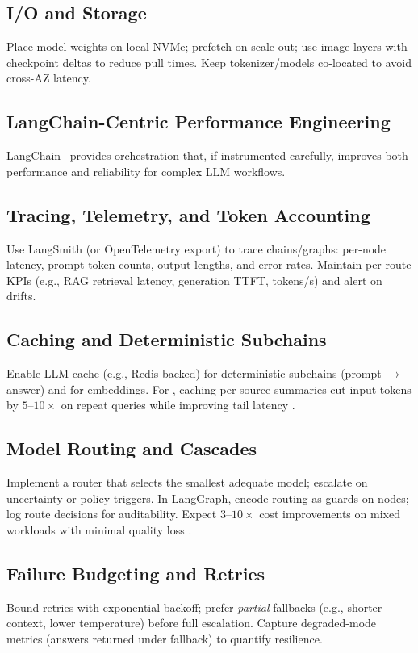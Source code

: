 \subsection{I/O and Storage}
Place model weights on local NVMe; prefetch on scale-out; use image layers with checkpoint deltas to reduce pull times. Keep tokenizer/models co-located to avoid cross-AZ latency.

\subsection{LangChain-Centric Performance Engineering}
\label{sec:perf-langchain}
LangChain~\cite{LangChain2023Framework} provides orchestration that, if instrumented carefully, improves both performance and reliability for complex LLM workflows.

\subsection{Tracing, Telemetry, and Token Accounting}
Use LangSmith (or OpenTelemetry export) to trace chains/graphs: per-node latency, prompt token counts, output lengths, and error rates. Maintain per-route KPIs (e.g., RAG retrieval latency, generation TTFT, tokens/s) and alert on drifts.

\subsection{Caching and Deterministic Subchains}
Enable LLM cache (e.g., Redis-backed) for deterministic subchains (prompt $\rightarrow$ answer) and for embeddings. For \ishtar{}, caching per-source summaries cut input tokens by $5$--$10\times$ on repeat queries while improving tail latency \cite{langchain-cache}.

\subsection{Model Routing and Cascades}
\label{sec:perf-model-routing}
Implement a router that selects the smallest adequate model; escalate on uncertainty or policy triggers. In LangGraph, encode routing as guards on nodes; log route decisions for auditability. Expect $3$--$10\times$ cost improvements on mixed workloads with minimal quality loss \cite{frugalgpt_2023}.

\subsection{Failure Budgeting and Retries}
Bound retries with exponential backoff; prefer \emph{partial} fallbacks (e.g., shorter context, lower temperature) before full escalation. Capture degraded-mode metrics (answers returned under fallback) to quantify resilience.


